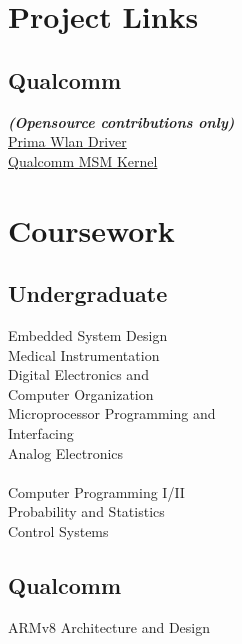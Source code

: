 \documentclass[letterpaper]{deedy-resume} %
\begin{document}
\begin{minipage}[t]{0.33\textwidth}
\sectionspace %


\section{Project Links}
\subsection{Qualcomm}
\footnotesize \textit{\textbf{(Opensource contributions only)} } \\
\href{https://www.codeaurora.org/cgit/quic/la/platform/vendor/qcom-opensource/wlan/prima/}{Prima Wlan Driver} \\
\href{https://www.codeaurora.org/cgit/quic/la/kernel/msm-3.10}{Qualcomm MSM Kernel} \\

\sectionspace %


\section{Coursework}

\subsection{Undergraduate}

\textbullet{} Embedded System Design \\
\textbullet{} Medical Instrumentation \\
\textbullet{} Digital Electronics and \\ \hphantom{\textbullet{}}Computer Organization \\
\textbullet{} Microprocessor Programming and \\ \hphantom{\textbullet{}}Interfacing \\
\textbullet{} Analog Electronics \\
 \\
\textbullet{} Computer Programming I/II \\
\textbullet{} Probability and Statistics \\
\textbullet{} Control Systems \\

\subsection{Qualcomm}
\textbullet{} ARMv8 Architecture and Design \\
\sectionspace %



\end{minipage} %
\end{document}
